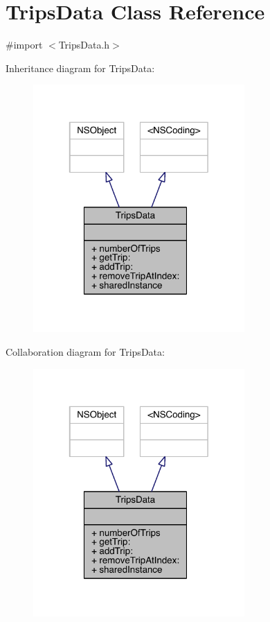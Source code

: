 \hypertarget{interface_trips_data}{\section{Trips\-Data Class Reference}
\label{interface_trips_data}
}


{\ttfamily \#import $<$Trips\-Data.\-h$>$}



Inheritance diagram for Trips\-Data\-:\nopagebreak
\begin{figure}[H]
\begin{center}
\leavevmode
\includegraphics[width=229pt]{interface_trips_data__inherit__graph}
\end{center}
\end{figure}


Collaboration diagram for Trips\-Data\-:\nopagebreak
\begin{figure}[H]
\begin{center}
\leavevmode
\includegraphics[width=229pt]{interface_trips_data__coll__graph}
\end{center}
\end{figure}
